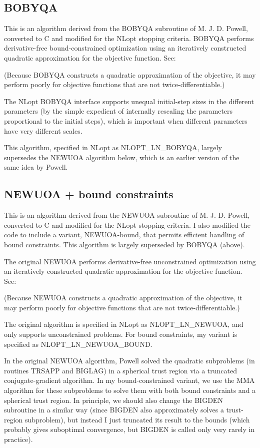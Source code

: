 \subsection{BOBYQA}
This is an algorithm derived from the BOBYQA subroutine of M. J. D. Powell, converted to C and modified for the NLopt stopping criteria. BOBYQA performs derivative-free bound-constrained optimization using an iteratively constructed quadratic approximation for the objective function. See: \cite{Powell2009}


(Because BOBYQA constructs a quadratic approximation of the objective, it may perform poorly for objective functions that are not twice-differentiable.) 

The NLopt BOBYQA interface supports unequal initial-step sizes in the different parameters (by the simple expedient of internally rescaling the parameters proportional to the initial steps), which is important when different parameters have very different scales. 

This algorithm, specified in NLopt as NLOPT\_LN\_BOBYQA, largely supersedes the NEWUOA algorithm below, which is an earlier version of the same idea by Powell. 




\subsection{NEWUOA + bound constraints}
This is an algorithm derived from the NEWUOA subroutine of M. J. D. Powell, converted to C and modified for the NLopt stopping criteria. I also modified the code to include a variant, NEWUOA-bound, that permits efficient handling of bound constraints. This algorithm is largely superseded by BOBYQA (above). 

The original NEWUOA performs derivative-free unconstrained optimization using an iteratively constructed quadratic approximation for the objective function. See: \cite{Powell_2004}



(Because NEWUOA constructs a quadratic approximation of the objective, it may perform poorly for objective functions that are not twice-differentiable.) 

The original algorithm is specified in NLopt as NLOPT\_LN\_NEWUOA, and only supports unconstrained problems. For bound constraints, my variant is specified as NLOPT\_LN\_NEWUOA\_BOUND. 

In the original NEWUOA algorithm, Powell solved the quadratic subproblems (in routines TRSAPP and BIGLAG) in a spherical trust region via a truncated conjugate-gradient algorithm. In my bound-constrained variant, we use the MMA algorithm for these subproblems to solve them with both bound constraints and a spherical trust region. In principle, we should also change the BIGDEN subroutine in a similar way (since BIGDEN also approximately solves a trust-region subproblem), but instead I just truncated its result to the bounds (which probably gives suboptimal convergence, but BIGDEN is called only very rarely in practice). 

